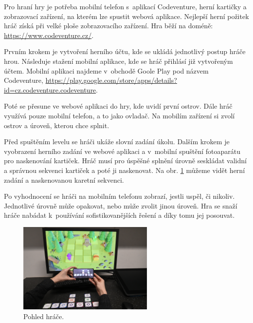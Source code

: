 Pro hraní hry je potřeba mobilní telefon s~aplikací Codeventure, herní kartičky a zobrazovací zařízení, na kterém lze spustit webová aplikace. Nejlepší herní požitek hráč získá při velké ploše zobrazovacího zařízení. Hra běží na doméně: \url{https://www.codeventure.cz/}.\par
Prvním krokem je vytvoření herního účtu, kde se ukládá jednotlivý postup hráče hrou. Následuje stažení mobilní aplikace, kde se hráč přihlásí již vytvořeným účtem. Mobilní aplikaci najdeme v~obchodě Goole Play pod názvem Codeventure, \url{https://play.google.com/store/apps/details?id=cz.codeventure.codeventure}.\par
Poté se přesune ve webové aplikaci do hry, kde uvidí první ostrov. Dále hráč využívá pouze mobilní telefon, a to jako ovladač. Na mobilím zařízení si zvolí ostrov a úroveň, kterou chce splnit.\par
Před spuštěním levelu se hráči ukáže slovní zadání úkolu. Dalším krokem je vyobrazení herního zadání ve webové aplikaci a v~mobilní spuštění fotoaparátu pro naskenování kartiček. Hráč musí pro úspěšné splnění úrovně seskládat validní a správnou sekvenci kartiček a poté ji naskenovat. Na obr. \ref{fig:pohled-hrace} můžeme vidět herní zadání a naskenovanou karetní sekvenci.\par
Po vyhodnocení se hráči na mobilním telefonu zobrazí, jestli uspěl, či nikoliv. Jednotlivé úrovně může opakovat, nebo může zvolit jinou úroveň. Hra se snaží hráče nabádat k~používání sofistikovanějších řešení a díky tomu jej posouvat. 

\begin{figure}[h]
    \centering
    \includegraphics[width=0.6\textwidth]{img/pohled-hrace.png}
    \caption{Pohled hráče.}
    \label{fig:pohled-hrace}
\end{figure}